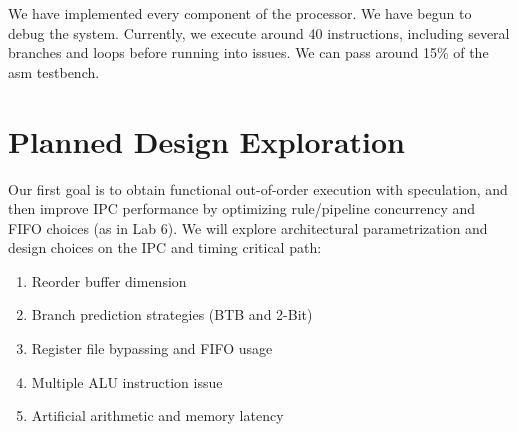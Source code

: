 \documentclass[12pt]{article}
\begin{document}
    We have implemented every component of the processor. We have begun to debug the system. Currently, we execute around 40 instructions, including several branches and loops before running into issues. We can pass around 15\% of the asm testbench.

    \section{Planned Design Exploration}
    
    Our first goal is to obtain functional out-of-order execution with speculation, and then improve IPC performance by optimizing rule/pipeline concurrency and FIFO choices (as in Lab 6). We will explore architectural parametrization and design choices on the IPC and timing critical path:    
    \begin{enumerate}
        \item Reorder buffer dimension
        \item Branch prediction strategies (BTB and 2-Bit)
        \item Register file bypassing and FIFO usage
        \item Multiple ALU instruction issue
        \item Artificial arithmetic and memory latency
    \end{enumerate}
    
    
    
    

 
\end{document}
